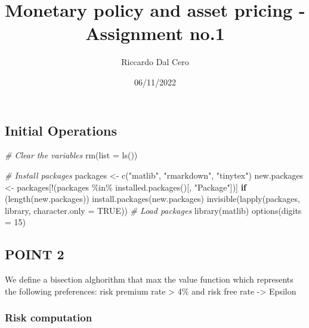 \documentclass[
]{article}
\title{Monetary policy and asset pricing - Assignment no.1}
\author{Riccardo Dal Cero}
\date{06/11/2022}
\newenvironment{Shaded}{\begin{snugshade}}{\end{snugshade}}
\newcommand{\AttributeTok}[1]{\textcolor[rgb]{0.77,0.63,0.00}{#1}}
\newcommand{\CommentTok}[1]{\textcolor[rgb]{0.56,0.35,0.01}{\textit{#1}}}
\newcommand{\ConstantTok}[1]{\textcolor[rgb]{0.00,0.00,0.00}{#1}}
\newcommand{\ControlFlowTok}[1]{\textcolor[rgb]{0.13,0.29,0.53}{\textbf{#1}}}
\newcommand{\DecValTok}[1]{\textcolor[rgb]{0.00,0.00,0.81}{#1}}
\newcommand{\FunctionTok}[1]{\textcolor[rgb]{0.00,0.00,0.00}{#1}}
\newcommand{\NormalTok}[1]{#1}
\newcommand{\OtherTok}[1]{\textcolor[rgb]{0.56,0.35,0.01}{#1}}
\newcommand{\SpecialCharTok}[1]{\textcolor[rgb]{0.00,0.00,0.00}{#1}}
\newcommand{\StringTok}[1]{\textcolor[rgb]{0.31,0.60,0.02}{#1}}
\begin{document}
\maketitle

\hypertarget{initial-operations}{%
\subsection{Initial Operations}\label{initial-operations}}

\begin{Shaded}
\begin{Highlighting}[]
\CommentTok{\# Clear the variables}
\FunctionTok{rm}\NormalTok{(}\AttributeTok{list =} \FunctionTok{ls}\NormalTok{())}

\CommentTok{\# Install packages}
\NormalTok{packages }\OtherTok{\textless{}{-}} \FunctionTok{c}\NormalTok{(}\StringTok{"matlib"}\NormalTok{, }\StringTok{"rmarkdown"}\NormalTok{, }\StringTok{"tinytex"}\NormalTok{)}
\NormalTok{new.packages }\OtherTok{\textless{}{-}}\NormalTok{ packages[}\SpecialCharTok{!}\NormalTok{(packages }\SpecialCharTok{\%in\%} \FunctionTok{installed.packages}\NormalTok{()[, }\StringTok{"Package"}\NormalTok{])]}
\ControlFlowTok{if}\NormalTok{ (}\FunctionTok{length}\NormalTok{(new.packages)) }\FunctionTok{install.packages}\NormalTok{(new.packages)}
\FunctionTok{invisible}\NormalTok{(}\FunctionTok{lapply}\NormalTok{(packages, library, }\AttributeTok{character.only =} \ConstantTok{TRUE}\NormalTok{))}
\CommentTok{\# Load packages}
\FunctionTok{library}\NormalTok{(matlib)}
\FunctionTok{options}\NormalTok{(}\AttributeTok{digits =} \DecValTok{15}\NormalTok{)}
\end{Highlighting}
\end{Shaded}

\hypertarget{point-2}{%
\subsection{POINT 2}\label{point-2}}

We define a bisection alghorithm that max the value function which
represents the following preferences: risk premium rate \textgreater{}
4\% and risk free rate -\textgreater{} Epsilon

\hypertarget{risk-computation}{%
\subsubsection{Risk computation}\label{risk-computation}}
\end{document}

